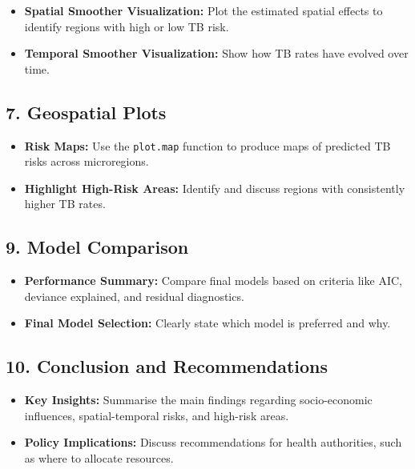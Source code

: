 \documentclass[
  11pt,
  a4paper,11pt]{article}
\begin{document}
\begin{itemize}
\item
  \textbf{Spatial Smoother Visualization:} Plot the estimated spatial
  effects to identify regions with high or low TB risk.
\item
  \textbf{Temporal Smoother Visualization:} Show how TB rates have
  evolved over time.
\end{itemize}

\subsection{\texorpdfstring{\textbf{7. Geospatial
Plots}}{7. Geospatial Plots}}\label{geospatial-plots}

\begin{itemize}
\item
  \textbf{Risk Maps:} Use the \texttt{plot.map} function to produce maps
  of predicted TB risks across microregions.
\item
  \textbf{Highlight High-Risk Areas:} Identify and discuss regions with
  consistently higher TB rates.
\end{itemize}

\subsection{\texorpdfstring{\textbf{9. Model
Comparison}}{9. Model Comparison}}\label{model-comparison}

\begin{itemize}
\item
  \textbf{Performance Summary:} Compare final models based on criteria
  like AIC, deviance explained, and residual diagnostics.
\item
  \textbf{Final Model Selection:} Clearly state which model is preferred
  and why.
\end{itemize}

\subsection{\texorpdfstring{\textbf{10. Conclusion and
Recommendations}}{10. Conclusion and Recommendations}}\label{conclusion-and-recommendations}

\begin{itemize}
\item
  \textbf{Key Insights:} Summarise the main findings regarding
  socio-economic influences, spatial-temporal risks, and high-risk
  areas.
\item
  \textbf{Policy Implications:} Discuss recommendations for health
  authorities, such as where to allocate resources.
\end{itemize}
\end{document}
